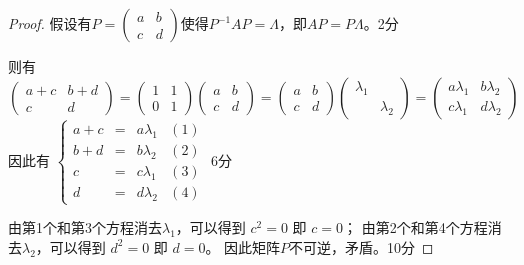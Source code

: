 \documentclass[noanswer]{USTBExam}
\begin{document}
\bigskip

\begin{proof}
  假设有$P = \left(
      \begin{array}{cc}
          a & b \\
          c & d
        \end{array}
      \right)$使得$P^{-1}AP = \Lambda$，即$AP=P\Lambda$。\dotfill 2分\par
  则有 $$\left(
      \begin{array}{cc}
          a + c & b + d \\
          c     & d
        \end{array}
      \right) = \left(
      \begin{array}{cc}
          1 & 1 \\
          0 & 1
        \end{array}
      \right) \left(
      \begin{array}{cc}
          a & b \\
          c & d
        \end{array}
      \right) = \left(
      \begin{array}{cc}
          a & b \\
          c & d
        \end{array}
      \right) \left(
      \begin{array}{cc}
          \lambda_1 &           \\
                    & \lambda_2
        \end{array}
      \right) = \left(
      \begin{array}{cc}
          a \lambda_1 & b \lambda_2 \\
          c \lambda_1 & d \lambda_2
        \end{array}
      \right)$$ 因此有 $\left\{
    \begin{array}{llll}
      a + c & = & a \lambda_1 & (1) \\
      b + d & = & b \lambda_2 & (2) \\
      c     & = & c \lambda_1 & (3) \\
      d     & = & d \lambda_2 & (4)
    \end{array}
    \right.$ \dotfill 6分\par
  由第1个和第3个方程消去$\lambda_1$，可以得到 $c^2 = 0$ 即 $c=0$；
  由第2个和第4个方程消去$\lambda_2$，可以得到 $d^2 = 0$ 即 $d=0$。
  因此矩阵$P$不可逆，矛盾。\dotfill 10分
\end{proof}
\end{document}
